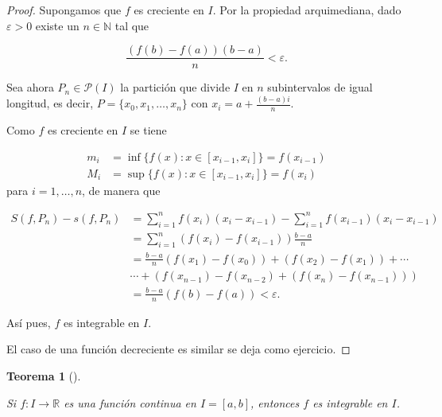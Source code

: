 \documentclass[
  a4paper,
]{scrreport}
\theoremstyle{plain}
\newtheorem{theorem}{Teorema}[chapter]
\theoremstyle{definition}
\theoremstyle{plain}
\theoremstyle{plain}
\theoremstyle{definition}
\theoremstyle{definition}
\theoremstyle{remark}
\begin{document}
\begin{tcolorbox}[enhanced jigsaw, titlerule=0mm, arc=.35mm, colframe=quarto-callout-note-color-frame, bottomrule=.15mm, opacitybacktitle=0.6, rightrule=.15mm, coltitle=black, colback=white, toprule=.15mm, title=\textcolor{quarto-callout-note-color}{\faInfo}\hspace{0.5em}{Demostración}, leftrule=.75mm, bottomtitle=1mm, opacityback=0, breakable, colbacktitle=quarto-callout-note-color!10!white, toptitle=1mm, left=2mm]

\begin{proof}
Supongamos que \(f\) es creciente en \(I\). Por la propiedad
arquimediana, dado \(\varepsilon>0\) existe un \(n\in\mathbb{N}\) tal
que

\[
\frac{(f(b)-f(a))(b-a)}{n} < \varepsilon.
\]

Sea ahora \(P_n\in\mathcal{P}(I)\) la partición que divide \(I\) en
\(n\) subintervalos de igual longitud, es decir,
\(P=\{x_0, x_1, \ldots, x_n\}\) con \(x_i = a+\frac{(b-a)i}{n}\).

Como \(f\) es creciente en \(I\) se tiene

\begin{align*}
m_i &= \inf\{f(x): x\in[x_{i-1},x_i]\} = f(x_{i-1})\\
M_i &= \sup\{f(x): x\in[x_{i-1},x_i]\} = f(x_{i})
\end{align*} para \(i=1,\ldots,n\), de manera que

\begin{align*}
S(f,P_n)-s(f,P_n) 
&= \sum_{i=1}^n f(x_i)(x_i-x_{i-1}) - \sum_{i=1}^n f(x_{i-1})(x_i-x_{i-1}) \\
&= \sum_{i=1}^n (f(x_i)-f(x_{i-1}))\frac{b-a}{n} \\
&= \frac{b-a}{n}(f(x_1)-f(x_0))+(f(x_2)-f(x_1))+ \cdots \\ 
& \cdots + (f(x_{n-1})-f(x_{n-2})+ (f(x_n)-f(x_{n-1}))) \\
&= \frac{b-a}{n}(f(b)-f(a)) < \varepsilon.
\end{align*}

Así pues, \(f\) es integrable en \(I\).

El caso de una función decreciente es similar se deja como ejercicio.
\end{proof}

\end{tcolorbox}

\begin{theorem}[]\protect\hypertarget{thm-integrabilidad-funciones-continuas}{}\label{thm-integrabilidad-funciones-continuas}

Si \(f:I\to\mathbb{R}\) es una función continua en \(I=[a,b]\), entonces
\(f\) es integrable en \(I\).

\end{theorem}
\end{document}
